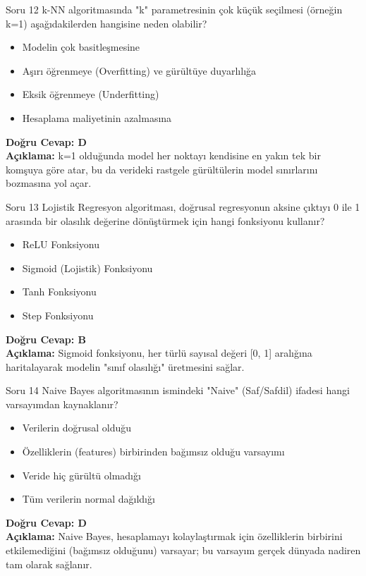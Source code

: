 \documentclass[12pt,a4paper]{article}
\begin{document}
\begin{testcard}{Soru 12}
    k-NN algoritmasında "k" parametresinin çok küçük seçilmesi (örneğin k=1) aşağıdakilerden hangisine neden olabilir?
    \begin{itemize}
        \item[A)] Modelin çok basitleşmesine
        \item[B)] Aşırı öğrenmeye (Overfitting) ve gürültüye duyarlılığa
        \item[C)] Eksik öğrenmeye (Underfitting)
        \item[D)] Hesaplama maliyetinin azalmasına
    \end{itemize}
    \tcblower
    \textbf{Doğru Cevap: D} \\
    \textbf{Açıklama:} k=1 olduğunda model her noktayı kendisine en yakın tek bir komşuya göre atar, bu da verideki rastgele gürültülerin model sınırlarını bozmasına yol açar.
\end{testcard}

\begin{testcard}{Soru 13}
    Lojistik Regresyon algoritması, doğrusal regresyonun aksine çıktıyı 0 ile 1 arasında bir olasılık değerine dönüştürmek için hangi fonksiyonu kullanır?
    \begin{itemize}
        \item[A)] ReLU Fonksiyonu
        \item[B)] Sigmoid (Lojistik) Fonksiyonu
        \item[C)] Tanh Fonksiyonu
        \item[D)] Step Fonksiyonu
    \end{itemize}
    \tcblower
    \textbf{Doğru Cevap: B} \\
    \textbf{Açıklama:} Sigmoid fonksiyonu, her türlü sayısal değeri [0, 1] aralığına haritalayarak modelin "sınıf olasılığı" üretmesini sağlar.
\end{testcard}

\begin{testcard}{Soru 14}
    Naive Bayes algoritmasının ismindeki "Naive" (Saf/Safdil) ifadesi hangi varsayımdan kaynaklanır?
    \begin{itemize}
        \item[A)] Verilerin doğrusal olduğu
        \item[B)] Özelliklerin (features) birbirinden bağımsız olduğu varsayımı
        \item[C)] Veride hiç gürültü olmadığı
        \item[D)] Tüm verilerin normal dağıldığı
    \end{itemize}
    \tcblower
    \textbf{Doğru Cevap: D} \\
    \textbf{Açıklama:} Naive Bayes, hesaplamayı kolaylaştırmak için özelliklerin birbirini etkilemediğini (bağımsız olduğunu) varsayar; bu varsayım gerçek dünyada nadiren tam olarak sağlanır.
\end{testcard}
\end{document}
